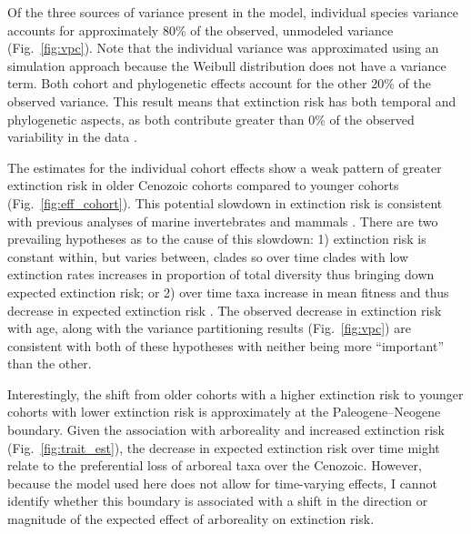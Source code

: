 Of the three sources of variance present in the model, individual species variance accounts for approximately 80\% of the observed, unmodeled variance (Fig.~\ref{fig:vpc}). Note that the individual variance was approximated using an simulation approach \cite{Goldstein2002} because the Weibull distribution does not have a variance term. Both cohort and phylogenetic effects account for the other 20\% of the observed variance. This result means that extinction risk has both temporal and phylogenetic aspects, as both contribute greater than 0\% of the observed variability in the data \cite{Housworth2004}. 

The estimates for the individual cohort effects show a weak pattern of greater extinction risk in older Cenozoic cohorts compared to younger cohorts (Fig.~\ref{fig:eff_cohort}). This potential slowdown in extinction risk is consistent with previous analyses of marine invertebrates \cite{Raup1982a,Foote2003} and mammals \cite{Alroy2010c,Alroy2000g}. There are two prevailing hypotheses as to the cause of this slowdown: 1) extinction risk is constant within, but varies between, clades so over time clades with low extinction rates increases in proportion of total diversity thus bringing down expected extinction risk; or 2) over time taxa increase in mean fitness and thus decrease in expected extinction risk \cite{Raup1982a}. The observed decrease in extinction risk with age, along with the variance partitioning results (Fig.~\ref{fig:vpc}) are consistent with both of these hypotheses with neither being more ``important'' than the other. 

Interestingly, the shift from older cohorts with a higher extinction risk to younger cohorts with lower extinction risk is approximately at the Paleogene--Neogene boundary. Given the association with arboreality and increased extinction risk (Fig.~\ref{fig:trait_est}), the decrease in expected extinction risk over time might relate to the preferential loss of arboreal taxa over the Cenozoic. However, because the model used here does not allow for time-varying effects, I cannot identify whether this boundary is associated with a shift in the direction or magnitude of the expected effect of arboreality on extinction risk.

